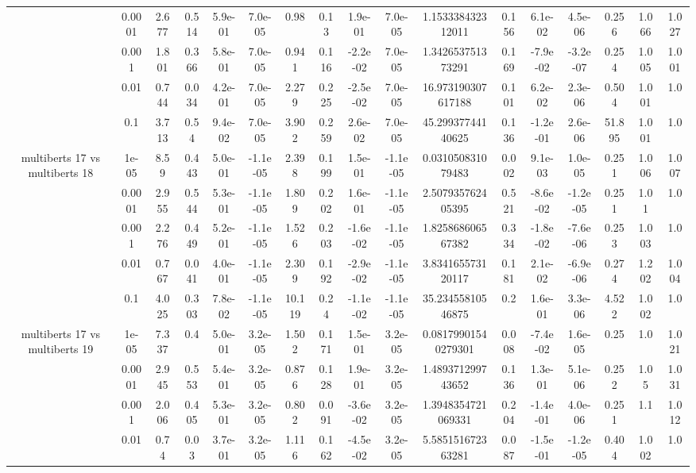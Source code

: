 \begin{tabular}{|c|c|c|c|c|c|c|c|c|c|c|c|c|c|c|c|c|}
 & 0.0001 & 2.677 & 0.514 & 5.9e-01 & 7.0e-05 & 0.98 & 0.13 & 1.9e-01 & 7.0e-05 & 1.153338432312011 & 0.156 & 6.1e-02 & 4.5e-06 & 0.256 & 1.066 & 1.027 \\
 & 0.001 & 1.801 & 0.366 & 5.8e-01 & 7.0e-05 & 0.941 & 0.116 & -2.2e-02 & 7.0e-05 & 1.342653751373291 & 0.169 & -7.9e-02 & -3.2e-07 & 0.254 & 1.005 & 1.001 \\
 & 0.01 & 0.744 & 0.034 & 4.2e-01 & 7.0e-05 & 2.279 & 0.225 & -2.5e-02 & 7.0e-05 & 16.973190307617188 & 0.101 & 6.2e-02 & 2.3e-06 & 0.504 & 1.001 & 1.0 \\
 & 0.1 & 3.713 & 0.54 & 9.4e-02 & 7.0e-05 & 3.902 & 0.259 & 2.6e-02 & 7.0e-05 & 45.29937744140625 & 0.136 & -1.2e-01 & 2.6e-06 & 51.895 & 1.001 & 1.0 \\
\hline
\multirow{5}{*}{multiberts 17 vs multiberts 18} & 1e-05 & 8.59 & 0.443 & 5.0e-01 & -1.1e-05 & 2.398 & 0.199 & 1.5e-01 & -1.1e-05 & 0.031050831079483 & 0.002 & 9.1e-03 & 1.0e-05 & 0.251 & 1.006 & 1.007 \\
 & 0.0001 & 2.955 & 0.544 & 5.3e-01 & -1.1e-05 & 1.809 & 0.202 & 1.6e-01 & -1.1e-05 & 2.507935762405395 & 0.521 & -8.6e-02 & -1.2e-05 & 0.251 & 1.01 & 1.0 \\
 & 0.001 & 2.276 & 0.449 & 5.2e-01 & -1.1e-05 & 1.526 & 0.203 & -1.6e-02 & -1.1e-05 & 1.825868606567382 & 0.334 & -1.8e-02 & -7.6e-06 & 0.253 & 1.003 & 1.0 \\
 & 0.01 & 0.767 & 0.041 & 4.0e-01 & -1.1e-05 & 2.309 & 0.192 & -2.9e-02 & -1.1e-05 & 3.834165573120117 & 0.181 & 2.1e-02 & -6.9e-06 & 0.274 & 1.202 & 1.004 \\
 & 0.1 & 4.025 & 0.303 & 7.8e-02 & -1.1e-05 & 10.119 & 0.24 & -1.1e-02 & -1.1e-05 & 35.23455810546875 & 0.2 & 1.6e-01 & 3.3e-06 & 4.522 & 1.002 & 1.0 \\
\hline
\multirow{5}{*}{multiberts 17 vs multiberts 19} & 1e-05 & 7.337 & 0.4 & 5.0e-01 & 3.2e-05 & 1.502 & 0.171 & 1.5e-01 & 3.2e-05 & 0.08179901540279301 & 0.008 & -7.4e-02 & 1.6e-05 & 0.25 & 1.0 & 1.021 \\
 & 0.0001 & 2.945 & 0.553 & 5.4e-01 & 3.2e-05 & 0.876 & 0.128 & 1.9e-01 & 3.2e-05 & 1.489371299743652 & 0.136 & 1.3e-01 & 5.1e-06 & 0.252 & 1.05 & 1.031 \\
 & 0.001 & 2.006 & 0.405 & 5.3e-01 & 3.2e-05 & 0.802 & 0.091 & -3.6e-02 & 3.2e-05 & 1.3948354721069331 & 0.204 & -1.4e-01 & 4.0e-06 & 0.251 & 1.1 & 1.012 \\
 & 0.01 & 0.74 & 0.03 & 3.7e-01 & 3.2e-05 & 1.116 & 0.162 & -4.5e-02 & 3.2e-05 & 5.585151672363281 & 0.087 & -1.5e-01 & -1.2e-05 & 0.404 & 1.002 & 1.0 \\

\end{tabular}
